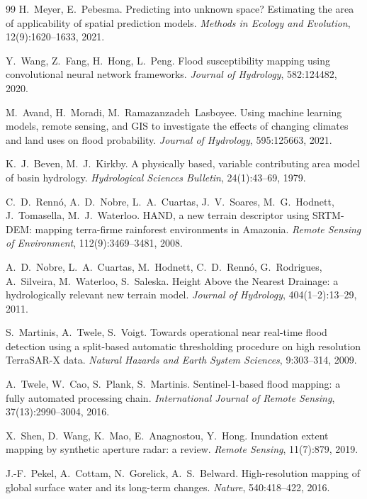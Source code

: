 \documentclass[10pt,twocolumn]{article}
\begin{document}
{\begin{thebibliography}{99}
H.~Meyer, E.~Pebesma.
Predicting into unknown space? Estimating the area of applicability of spatial
prediction models.
\emph{Methods in Ecology and Evolution}, 12(9):1620--1633, 2021.

Y.~Wang, Z.~Fang, H.~Hong, L.~Peng.
Flood susceptibility mapping using convolutional neural network frameworks.
\emph{Journal of Hydrology}, 582:124482, 2020.

M.~Avand, H.~Moradi, M.~Ramazanzadeh~Lasboyee.
Using machine learning models, remote sensing, and GIS to investigate the effects
of changing climates and land uses on flood probability.
\emph{Journal of Hydrology}, 595:125663, 2021.

K.~J.~Beven, M.~J.~Kirkby.
A physically based, variable contributing area model of basin hydrology.
\emph{Hydrological Sciences Bulletin}, 24(1):43--69, 1979.

C.~D.~Renn\'o, A.~D.~Nobre, L.~A.~Cuartas, J.~V.~Soares, M.~G.~Hodnett,
J.~Tomasella, M.~J.~Waterloo.
HAND, a new terrain descriptor using SRTM-DEM: mapping terra-firme rainforest
environments in Amazonia.
\emph{Remote Sensing of Environment}, 112(9):3469--3481, 2008.

A.~D.~Nobre, L.~A.~Cuartas, M.~Hodnett, C.~D.~Renn\'o, G.~Rodrigues, A.~Silveira,
M.~Waterloo, S.~Saleska.
Height Above the Nearest Drainage: a hydrologically relevant new terrain model.
\emph{Journal of Hydrology}, 404(1--2):13--29, 2011.

S.~Martinis, A.~Twele, S.~Voigt.
Towards operational near real-time flood detection using a split-based automatic
thresholding procedure on high resolution TerraSAR-X data.
\emph{Natural Hazards and Earth System Sciences}, 9:303--314, 2009.

A.~Twele, W.~Cao, S.~Plank, S.~Martinis.
Sentinel-1-based flood mapping: a fully automated processing chain.
\emph{International Journal of Remote Sensing}, 37(13):2990--3004, 2016.

X.~Shen, D.~Wang, K.~Mao, E.~Anagnostou, Y.~Hong.
Inundation extent mapping by synthetic aperture radar: a review.
\emph{Remote Sensing}, 11(7):879, 2019.

J.-F.~Pekel, A.~Cottam, N.~Gorelick, A.~S.~Belward.
High-resolution mapping of global surface water and its long-term changes.
\emph{Nature}, 540:418--422, 2016.


\end{thebibliography}}
\end{document}
